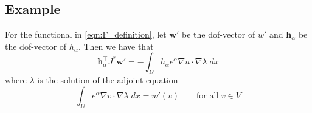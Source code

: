 \documentclass[11pt]{article}
\renewcommand{\vec}[1]{\boldsymbol{#1}}
\begin{document}
\subsection{Example}
For the functional in \eqref{eqn:F_definition}, let $\vec{w}'$ be the dof-vector of $w'$ and $\vec{h}_\alpha$ be the dof-vector of $h_\alpha$. Then we have that
\begin{equation}
    \vec{h}_\alpha^\top J^* \vec{w}' = - \int_\Omega h_\alpha e^\alpha \nabla u\cdot \nabla \lambda\; dx
\end{equation}
where $\lambda$ is the solution of the adjoint equation
\begin{equation}
    \int_\Omega e^{\alpha} \nabla v\cdot \nabla\lambda \;dx = w'(v) \qquad\text{for all $v\in V$}
\end{equation}


\end{document}
